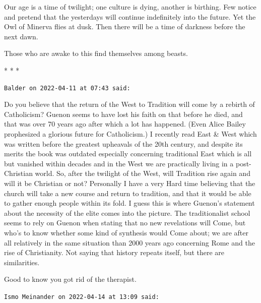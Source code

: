 Our age is a time of twilight; one culture is dying, another is birthing. Few notice and pretend that the yesterdays will continue indefinitely into the future. Yet the Owl of Minerva flies at dusk. Then there will be a time of darkness before the next dawn.

Those who are awake to this find themselves among beasts.



\begin{center}* * *\end{center}

\begin{footnotesize}
\begin{sffamily}
\texttt{Balder on 2022-04-11 at 07:43 said:}

Do you believe that the return of the West to Tradition will come by a rebirth of Catholicism? Guenon seems to have lost his faith on that before he died, and that was over 70 years ago after which a lot has happened. (Even Alice Bailey prophesized a glorious future for Catholicism.) I recently read East \& West which was written before the greatest upheavals of the 20th century, and despite its merits the book was outdated especially concerning traditional East which is all but vanished within decades and in the West we are practically living in a post-Christian world. So, after the twilight of the West, will Tradition rise again and will it be Christian or not? Personally I have a very Hard time believing that the church will take a new course and return to tradition, and that it would be able to gather enough people within its fold. I guess this is where Guenon's statement about the necessity of the elite comes into the picture. The traditionalist school seems to rely on Guenon when stating that no new revelations will Come, but who's to know whether some kind of synthesis would Come about; we are after all relatively in the same situation than 2000 years ago concerning Rome and the rise of Christianity. Not saying that history repeats itself, but there are similarities.

Good to know you got rid of the therapist.

\hfill

\texttt{Ismo Meinander on 2022-04-14 at 13:09 said:}


\end{sffamily}
\end{footnotesize}
